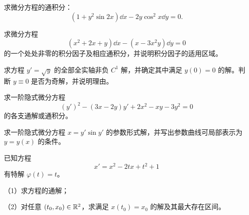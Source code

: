 \noindent\begin{minipage}{\linewidth}
求微分方程的通积分：
\[(1+y^2\sin2x)\dd x-2y\cos^2x\dd y=0.\]
\end{minipage}\par\vspace{5pt}
\noindent\begin{minipage}{\linewidth}
求微分方程
\[(x^2+2x+y)\dd x-(x-3x^2y)\dd y=0\]
的一个处处非零的积分因子及相应通积分，并说明积分因子的适用区域。
\end{minipage}\par\vspace{5pt}
\noindent\begin{minipage}{\linewidth}
求方程 $y'=\sqrt y$ 的全部全实轴非负 $C^1$ 解，并确定其中满足 $y(0)=0$ 的解。判断 $y\equiv0$ 是否为奇解，并说明理由。
\end{minipage}\par\vspace{5pt}
\noindent\begin{minipage}{\linewidth}
求一阶隐式微分方程
\[(y')^2-(3x-2y)y'+2x^2-xy-3y^2=0\]
的各支通解或通积分。
\end{minipage}\par\vspace{5pt}
\noindent\begin{minipage}{\linewidth}
求一阶隐式微分方程 $x=y'\sin y'$ 的参数形式解，并写出参数曲线可局部表示为 $y=y(x)$ 的条件。
\end{minipage}\par\vspace{5pt}
\noindent\begin{minipage}{\linewidth}
已知方程
\[x'=x^2-2tx+t^2+1\]
有特解 $\varphi(t)=t$。
\par（1）求方程的通解；\par（2）对任意 $(t_0,x_0)\in\mathbb R^2$，求满足 $x(t_0)=x_0$ 的解及其最大存在区间。
\end{minipage}\par\vspace{5pt}
